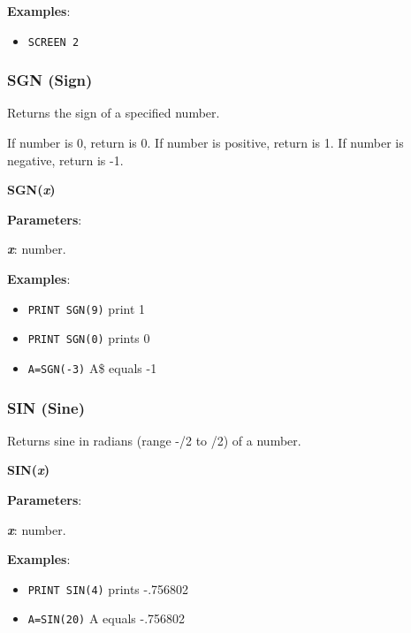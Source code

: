     \textbf{Examples}:
    \begin{itemize}
        \item \texttt{SCREEN 2}
    \end{itemize}

    \subsubsection{{SGN (Sign)}}
    \label{msbasic:lang:sgn}
    Returns the sign of a specified number.

    If number is 0, return is 0. If number is positive, return is 1. If number
    is negative, return is -1.

    \hspace{1.9cm}\textbf{SGN(\textit{x})}

    \textbf{Parameters}:

    \hspace{1cm}\textbf{\textit{x}}: number.

    \textbf{Examples}:
    \begin{itemize}
        \item \texttt{PRINT SGN(9)} print 1
        \item \texttt{PRINT SGN(0)} prints 0
        \item \texttt{A=SGN(-3)} A\$ equals -1
    \end{itemize}

    \subsubsection{{SIN (Sine)}}
    \label{msbasic:lang:sin}
    Returns sine in radians (range -\textpi/2 to \textpi/2) of a number.

    \hspace{1.9cm}\textbf{SIN(\textit{x})}

    \textbf{Parameters}:

    \hspace{1cm}\textbf{\textit{x}}: number.

    \textbf{Examples}:
    \begin{itemize}
        \item \texttt{PRINT SIN(4)} prints -.756802
        \item \texttt{A=SIN(20)} A equals -.756802
    \end{itemize}

